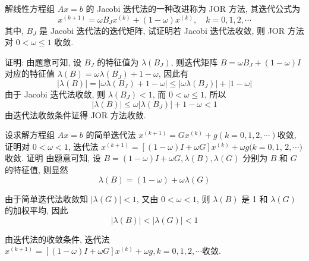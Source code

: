   \begin{tcolorbox}[enhanced,colback=10,colframe=9,breakable,coltitle=green!25!black,title=2024]
 解线性方程组 $ A x=b $ 的 Jacobi 迭代法的一种改进称为 JOR 方法, 其迭代公式为
$$
x^{(k+1)}=\omega B_{J} x^{(k)}+(1-\omega) x^{(k)}, \quad k=0,1,2, \cdots
$$
其中, $ B_{J} $ 是 Jacobi 迭代法的迭代矩阵, 试证明若 Jacobi 迭代法收敛, 则 JOR 方法对 $ 0<\omega \leqslant 1 $ 收敛.
 \tcblower

证明: 由题意可知, 设 $ B_{J} $ 的特征值为 $ \lambda\left(B_{J}\right) $, 则迭代矩阵 $ B=\omega B_{J}+(1-\omega) I $对应的特征值 $ \lambda(B)=\omega \lambda\left(B_{J}\right)+1-\omega $, 因此有
$$
|\lambda(B)|=\left|\omega \lambda\left(B_{J}\right)+1-\omega\right| \leqslant\left|\omega \lambda\left(B_{J}\right)\right|+|1-\omega|
$$
由于 Jacobi 迭代法收敛, 则 $ \lambda\left(B_{J}\right)<1 $, 而 $ 0<\omega \leqslant 1 $, 所以
$$
|\lambda(B)| \leqslant \omega\left|\lambda\left(B_{J}\right)\right|+1-\omega<1
$$
由迭代法收敛条件证得 JOR 方法收敛.
 \end{tcolorbox}


  \begin{tcolorbox}[enhanced,colback=10,colframe=9,breakable,coltitle=green!25!black,title=2024]
 设求解方程组 $ A x=b $ 的简单迭代法 $ x^{(k+1)}=G x^{(k)}+g(k=0,1,2, \cdots) $收敛, 证明对 $ 0<\omega<1 $, 迭代法 $ x^{(k+1)}=[(1-\omega) I+\omega G] x^{(k)}+\omega g(k=0,1 $, $ 2, \cdots) $ 收敛.
 \tcblower
证明 由题意可知, 设 $ B=(1-\omega) I+\omega G, \lambda(B), \lambda(G) $ 分别为 $ B $ 和 $ G $ 的特征值, 则显然
$$
\lambda(B)=(1-\omega)+\omega \lambda(G)
$$

由于简单迭代法收敛知 $ |\lambda(G)|<1 $, 又由 $ 0<\omega<1 $, 则 $ \lambda(B) $ 是 1 和 $ \lambda(G) $ 的加权平均, 因此
$$
|\lambda(B)|<|\lambda(G)|<1
$$

由迭代法的收敛条件, 迭代法 $ x^{(k+1)}=[(1-\omega) I+\omega G] x^{(k)}+\omega g, k=0,1,2, \cdots $收敛.

 \end{tcolorbox}



